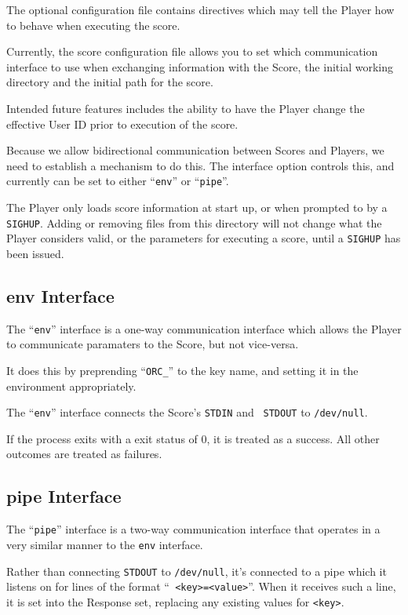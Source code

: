 \documentclass[a4paper]{article}
\begin{document}
The optional configuration file contains directives which may tell the
Player how to behave when executing the score.

Currently, the score configuration file allows you to set which
communication interface to use when exchanging information with the
Score, the initial working directory and the initial path for the
score.

Intended future features includes the ability to have the Player
change the effective User ID prior to execution of the score.

Because we allow bidirectional communication between Scores and
Players, we need to establish a mechanism to do this.  The interface
option controls this, and currently can be set to either ``{\tt env}''
or ``{\tt pipe}''.

The Player only loads score information at start up, or when prompted
to by a {\tt SIGHUP}.  Adding or removing files from this directory
will not change what the Player considers valid, or the parameters for
executing a score, until a {\tt SIGHUP} has been issued.

\subsection{env Interface}

The ``{\tt env}'' interface is a one-way communication interface which
allows the Player to communicate paramaters to the Score, but not
vice-versa.

It does this by preprending ``{\tt ORC\_}'' to the key name, and
setting it in the environment appropriately.

The ``{\tt env}'' interface connects the Score's {\tt STDIN} and {\tt
  STDOUT} to {\tt /dev/null}.

If the process exits with a exit status of 0, it is treated as a
success.  All other outcomes are treated as failures.

\subsection{pipe Interface}

The ``{\tt pipe}'' interface is a two-way communication interface that
operates in a very similar manner to the {\tt env} interface.

Rather than connecting {\tt STDOUT} to {\tt /dev/null}, it's connected
to a pipe which it listens on for lines of the format ``{\tt
  <key>=<value>}''.  When it receives such a line, it is set into the
Response set, replacing any existing values for {\tt <key>}.
\end{document}
